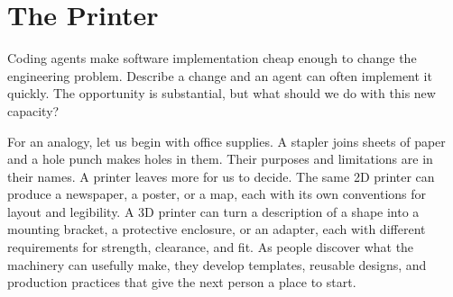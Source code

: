


\chapter{The Printer}


Coding agents make software implementation cheap enough to change the engineering problem. Describe a change and an agent can often implement it quickly. The opportunity is substantial, but what should we do with this new capacity?




For an analogy, let us begin with office supplies. A stapler joins sheets of paper and a hole punch makes holes in them. Their purposes and limitations are in their names. A printer leaves more for us to decide. The same 2D printer can produce a newspaper, a poster, or a map, each with its own conventions for layout and legibility. A 3D printer can turn a description of a shape into a mounting bracket, a protective enclosure, or an adapter, each with different requirements for strength, clearance, and fit. As people discover what the machinery can usefully make, they develop templates, reusable designs, and production practices that give the next person a place to start.



